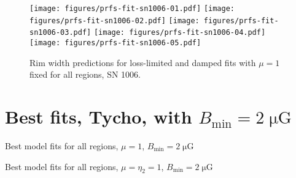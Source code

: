 \documentclass[iop, apj, numberedappendix]{emulateapj}
\newcommand*{\mt}{\mathrm}
\newcommand*{\unit}[1]{\;\mt{#1}}  %
\newcommand*{\Bmin}{B_{\mt{min}}}
\newcommand*{\muG}{\unit{\mu G}}
\begin{document}
\begin{figure*}[h]
    \centering
    \texttt{[image: figures/prfs-fit-sn1006-01.pdf]}
    \texttt{[image: figures/prfs-fit-sn1006-02.pdf]}
    \texttt{[image: figures/prfs-fit-sn1006-03.pdf]}
    \texttt{[image: figures/prfs-fit-sn1006-04.pdf]}
    \texttt{[image: figures/prfs-fit-sn1006-05.pdf]}
    \caption{Rim width predictions for loss-limited and damped fits with
    $\mu = 1$ fixed for all regions, SN 1006.}
\end{figure*}


\clearpage
\section{Best fits, Tycho, with $\Bmin=2\muG$}

\begin{table}[ht]
    \scriptsize
    \centering
    \caption{Best model fits for all regions, $\mu = 1$, $\Bmin=2\muG$}
    
\end{table}

\begin{table}[ht]
    \scriptsize
    \centering
    \caption{Best model fits for all regions, $\mu = \eta_2 = 1$,
        $\Bmin=2\muG$}
    
\end{table}
\end{document}
